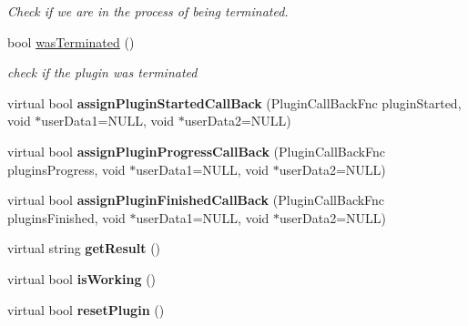\begin{DoxyCompactItemize}
\begin{DoxyCompactList}\small\item\em Check if we are in the process of being terminated. \end{DoxyCompactList}\item 
\hypertarget{classrrp_1_1_plugin_ad1aa634241ef70a0b4af580f21b8ac16}{bool \hyperlink{classrrp_1_1_plugin_ad1aa634241ef70a0b4af580f21b8ac16}{was\-Terminated} ()}\label{classrrp_1_1_plugin_ad1aa634241ef70a0b4af580f21b8ac16}

\begin{DoxyCompactList}\small\item\em check if the plugin was terminated \end{DoxyCompactList}\item 
\hypertarget{classrrp_1_1_plugin_a828a016751bfffc342e398d3203d2624}{virtual bool {\bfseries assign\-Plugin\-Started\-Call\-Back} (Plugin\-Call\-Back\-Fnc plugin\-Started, void $\ast$user\-Data1=N\-U\-L\-L, void $\ast$user\-Data2=N\-U\-L\-L)}\label{classrrp_1_1_plugin_a828a016751bfffc342e398d3203d2624}

\item 
\hypertarget{classrrp_1_1_plugin_ae7798a936acdcf8934bc859bd4fb5bf7}{virtual bool {\bfseries assign\-Plugin\-Progress\-Call\-Back} (Plugin\-Call\-Back\-Fnc plugins\-Progress, void $\ast$user\-Data1=N\-U\-L\-L, void $\ast$user\-Data2=N\-U\-L\-L)}\label{classrrp_1_1_plugin_ae7798a936acdcf8934bc859bd4fb5bf7}

\item 
\hypertarget{classrrp_1_1_plugin_a6ca31b07721dbc2febc12d214f44fc79}{virtual bool {\bfseries assign\-Plugin\-Finished\-Call\-Back} (Plugin\-Call\-Back\-Fnc plugins\-Finished, void $\ast$user\-Data1=N\-U\-L\-L, void $\ast$user\-Data2=N\-U\-L\-L)}\label{classrrp_1_1_plugin_a6ca31b07721dbc2febc12d214f44fc79}

\item 
\hypertarget{classrrp_1_1_plugin_ad071dec0887403ac2e91e86164982f53}{virtual string {\bfseries get\-Result} ()}\label{classrrp_1_1_plugin_ad071dec0887403ac2e91e86164982f53}

\item 
\hypertarget{classrrp_1_1_plugin_a2771cad1a3958152e20391a7672e4f1e}{virtual bool {\bfseries is\-Working} ()}\label{classrrp_1_1_plugin_a2771cad1a3958152e20391a7672e4f1e}

\item 
\hypertarget{classrrp_1_1_plugin_a8c2db6ead987a6d9029410b48a13020d}{virtual bool {\bfseries reset\-Plugin} ()}\label{classrrp_1_1_plugin_a8c2db6ead987a6d9029410b48a13020d}


\end{DoxyCompactItemize}
